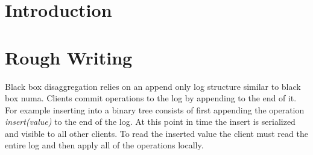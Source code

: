 \section{Introduction}
\label{sec:intro}




\section{Rough Writing}

Black box disaggregation relies on an append only log
structure similar to black box numa. Clients commit
operations to the log by appending to the end of it. For
example inserting into a binary tree consists of first
appending the operation \textit{insert(value)} to the end of
the log. At this point in time the insert is serialized and
visible to all other clients. To read the inserted value the
client must read the entire log and then apply all of the
operations locally.

